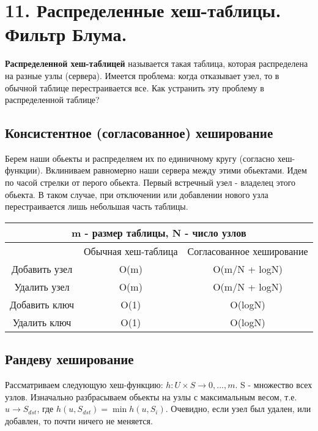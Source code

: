 \section*{11. Распределенные хеш-таблицы. Фильтр Блума.}
 

 {\bf Распределенной хеш-таблицей} называется такая таблица, которая распределена на разные узлы (сервера).
 Имеется проблема: когда отказывает узел, то в обычной таблице перестраивается все. Как устранить эту проблему в распределенной таблице?

\subsection {Консистентное (согласованное) хеширование}
Берем наши обьекты и распределяем их по единичному кругу (согласно хеш-функции). Вклиниваем равномерно наши сервера между этими обьектами. Идем по часой стрелки от перого обьекта. Первый встречный узел - владелец этого обьекта. В таком случае, при отключении или добавлении нового узла перестраивается лишь небольшая часть таблицы. 

\begin{table}[]
\begin{tabular}{|c|c|c|}
\hline
\multicolumn{3}{|c|}{m - размер таблицы, N - число узлов}       \\ \hline
              & Обычная хеш-таблица & Согласованное хеширование \\ \hline
Добавить узел & O(m)                & O(m/N + logN)             \\ \hline
Удалить узел  & O(m)                & O(m/N + logN)             \\ \hline
Добавить ключ & O(1)                & O(logN)                   \\ \hline
Удалить ключ  & O(1)                & O(logN)                   \\ \hline
\end{tabular}
\end{table}

\subsection {Рандеву хеширование}
Рассматриваем следующую хеш-функцию: $h: U \times S \rightarrow {0, ..., m}$. S - множество всех узлов. Изначально разбрасываем обьекты на узлы с максимальным весом, т.е. 
$u \rightarrow S_{dst}$, где $h(u, S_{dst}) = \min h(u, S_i)$. Очевидно, если узел был удален, или добавлен, то почти ничего не меняется.


